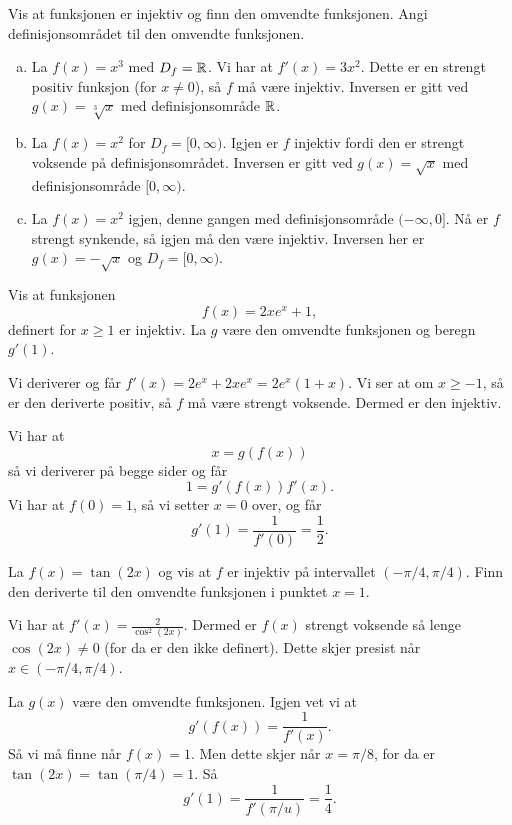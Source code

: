 \documentclass[11pt, norsk]{article}
\begin{document}
\begin{oppg}[7.4.1]
Vis at funksjonen er injektiv og finn den omvendte funksjonen. Angi definisjonsområdet til den omvendte funksjonen.
\end{oppg}
\begin{losn}
\begin{enumerate}[a)]
\item La $f(x)=x^3$ med $D_f=\mathbb{R}$. Vi har at $f'(x)=3x^2$. Dette er en strengt positiv funksjon (for $x\neq 0$), så $f$ må være injektiv. Inversen er gitt ved $g(x)=\sqrt[3]{x}$ med definisjonsområde $\mathbb{R}$.
\item La $f(x)=x^2$ for $D_f=[0, \infty)$. Igjen er $f$ injektiv fordi den er strengt voksende på definisjonsområdet. Inversen er gitt ved $g(x) = \sqrt{x}$ med definisjonsområde $[0,\infty)$.
\item La $f(x)=x^2$ igjen, denne gangen med definisjonsområde $(-\infty,0]$. Nå er $f$ strengt synkende, så igjen må den være injektiv. Inversen her er $g(x)=-\sqrt{x}$ og $D_f=[0, \infty)$. 
\end{enumerate}
\end{losn}

\begin{oppg}[7.3]
Vis at funksjonen
$$
f(x) = 2xe^x + 1,
$$
definert for $x \geq 1$ er injektiv. La $g$ være den omvendte funksjonen og beregn $g'(1)$.
\end{oppg}
\begin{losn}
Vi deriverer og får $f'(x) = 2e^x+2xe^x=2e^x(1+x)$. Vi ser at om $x \geq -1$, så er den deriverte positiv, så $f$ må være strengt voksende. Dermed er den injektiv. 

Vi har at 
$$
x=g(f(x))
$$
så vi deriverer på begge sider og får 
$$
1 = g'(f(x))f'(x).
$$
Vi har at $f(0)=1$, så vi setter $x=0$ over, og får
$$
g'(1)=\frac{1}{f'(0)}=\frac{1}{2}.
$$
\end{losn}

\begin{oppg}[7.4.5]
La $f(x)=\tan(2x)$ og vis at $f$ er injektiv på intervallet $(-\pi/4,\pi/4)$. Finn den deriverte til den omvendte funksjonen i punktet $x=1$.
\end{oppg}
\begin{losn}
Vi har at $f'(x) = \frac{2}{\cos^2(2x)}$. Dermed er $f(x)$ strengt voksende så lenge $\cos(2x) \neq 0$ (for da er den ikke definert). Dette skjer presist når $x \in (-\pi/4,\pi/4)$.

La $g(x)$ være den omvendte funksjonen. Igjen vet vi at
$$
g'(f(x)) = \frac{1}{f'(x)}.
$$
Så vi må finne når $f(x)=1$. Men dette skjer når $x=\pi/8$, for da er $\tan(2x)=\tan(\pi/4)=1$. Så
$$
g'(1)=\frac{1}{f'(\pi/u)} = \frac 14.
$$
\end{losn}
\end{document}
